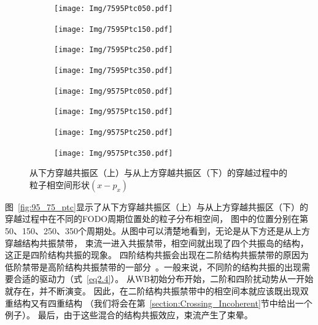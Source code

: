 \begin{figure}
    \centering
    \begin{subfigure}[b]{0.24\textwidth}
        \texttt{[image: Img/7595Ptc050.pdf]}
        \caption{}
        \label{sfig:75_95_ptc1}
    \end{subfigure}
    \begin{subfigure}[b]{0.24\textwidth}
        \texttt{[image: Img/7595Ptc150.pdf]}
        \caption{}
        \label{sfig:75_95_ptc2}
    \end{subfigure}
    \begin{subfigure}[b]{0.24\textwidth}
        \texttt{[image: Img/7595Ptc250.pdf]}
        \caption{}
        \label{sfig:75_95_ptc3}
    \end{subfigure}
    \begin{subfigure}[b]{0.24\textwidth}
        \texttt{[image: Img/7595Ptc350.pdf]}
        \caption{}
        \label{sfig:75_95_ptc4}
    \end{subfigure}

    \begin{subfigure}[b]{0.24\textwidth}
        \texttt{[image: Img/9575Ptc050.pdf]}
        \caption{}
        \label{sfig:95_75_ptc1}
    \end{subfigure}
    \begin{subfigure}[b]{0.24\textwidth}
        \texttt{[image: Img/9575Ptc150.pdf]}
        \caption{}
        \label{sfig:95_75_ptc2}
    \end{subfigure}
    \begin{subfigure}[b]{0.24\textwidth}
        \texttt{[image: Img/9575Ptc250.pdf]}
        \caption{}
        \label{sfig:95_75_ptc3}
    \end{subfigure}
    \begin{subfigure}[b]{0.24\textwidth}
        \texttt{[image: Img/9575Ptc350.pdf]}
        \caption{}
        \label{sfig:95_75_ptc4}
    \end{subfigure}
    \caption{从下方穿越共振区（上）与从上方穿越共振区（下）的穿越过程中的粒子相空间形状$(x-p_x)$}
    \label{fig:95_75_ptc}
\end{figure}

图~\eqref{fig:95_75_ptc}显示了从下方穿越共振区（上）与从上方穿越共振区（下）的穿越过程中在不同的FODO周期位置处的粒子分布相空间，
图中的位置分别在第50、150、250、350个周期处。从图中可以清楚地看到，无论是从下方还是从上方穿越结构共振禁带，
束流一进入共振禁带，相空间就出现了四个共振岛的结构，这正是四阶结构共振的现象。
四阶结构共振会出现在二阶结构共振禁带的原因为低阶禁带是高阶结构共振禁带的一部分~\cite{11,li2018structure}。一般来说，不同阶的结构共振的出现需要合适的驱动力（式~\eqref{eq2.4}）。
从WB初始分布开始，二阶和四阶扰动势从一开始就存在，并不断演变。
因此，在二阶结构共振禁带中的相空间本就应该既出现双重结构又有四重结构 （我们将会在第~\eqref{section:Crossing_Incoherent}节中给出一个例子）。
最后，由于这些混合的结构共振效应，束流产生了束晕。

